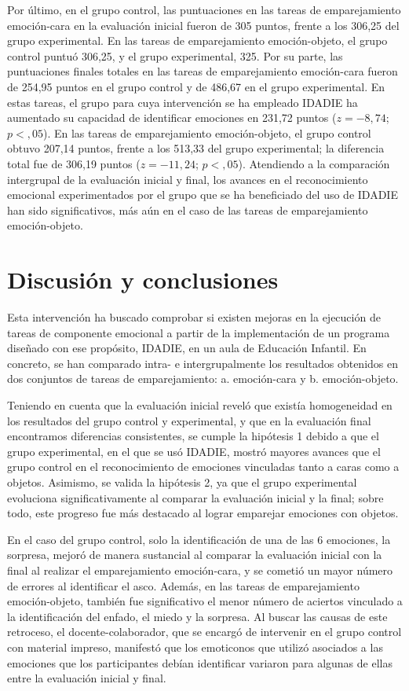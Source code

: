 \documentclass[spanish]{textolivre}
\begin{document}
Por último, en el grupo control, las puntuaciones en las tareas de emparejamiento emoción-cara en la evaluación inicial fueron de 305 puntos, frente a los 306,25 del grupo experimental. En las tareas de emparejamiento emoción-objeto, el grupo control puntuó 306,25, y el grupo experimental, 325. Por su parte, las puntuaciones finales totales en las tareas de emparejamiento emoción-cara fueron de 254,95 puntos en el grupo control y de 486,67 en el grupo experimental. En estas tareas, el grupo para cuya intervención se ha empleado IDADIE ha aumentado su capacidad de identificar emociones en 231,72 puntos ($z = -8,74$; $p < ,05$). En las tareas de emparejamiento emoción-objeto, el grupo control obtuvo 207,14 puntos, frente a los 513,33 del grupo experimental; la diferencia total fue de 306,19 puntos ($z = -11,24$; $p < ,05$). Atendiendo a la comparación intergrupal de la evaluación inicial y final, los avances en el reconocimiento emocional experimentados por el grupo que se ha beneficiado del uso de IDADIE han sido significativos, más aún en el caso de las tareas de emparejamiento emoción-objeto.

\section{Discusión y conclusiones}\label{sec-titulo}
Esta intervención ha buscado comprobar si existen mejoras en la ejecución de tareas de componente emocional a partir de la implementación de un programa diseñado con ese propósito, IDADIE, en un aula de Educación Infantil. En concreto, se han comparado intra- e intergrupalmente los resultados obtenidos en dos conjuntos de tareas de emparejamiento: a. emoción-cara y b. emoción-objeto. 

Teniendo en cuenta que la evaluación inicial reveló que existía homogeneidad en los resultados del grupo control y experimental, y que en la evaluación final encontramos diferencias consistentes, se cumple la hipótesis 1 debido a que el grupo experimental, en el que se usó IDADIE, mostró mayores avances que el grupo control en el reconocimiento de emociones vinculadas tanto a caras como a objetos. Asimismo, se valida la hipótesis 2, ya que el grupo experimental evoluciona significativamente al comparar la evaluación inicial y la final; sobre todo, este progreso fue más destacado al lograr emparejar emociones con objetos. 

En el caso del grupo control, solo la identificación de una de las 6 emociones, la sorpresa, mejoró de manera sustancial al comparar la evaluación inicial con la final al realizar el emparejamiento emoción-cara, y se cometió un mayor número de errores al identificar el asco. Además, en las tareas de emparejamiento emoción-objeto, también fue significativo el menor número de aciertos vinculado a la identificación del enfado, el miedo y la sorpresa. Al buscar las causas de este retroceso, el docente-colaborador, que se encargó de intervenir en el grupo control con material impreso, manifestó que los emoticonos que utilizó asociados a las emociones que los participantes debían identificar variaron para algunas de ellas entre la evaluación inicial y final.
\end{document}
